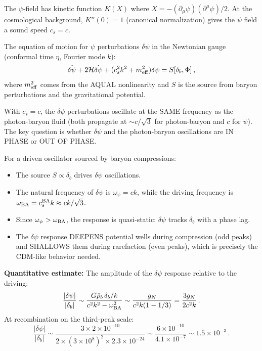 \documentclass[11pt]{article}
\newcommand{\ee}[1]{\times 10^{#1}}
\newcommand{\dpsi}{\delta\psi}
\newcommand{\rhob}{\bar{\rho}_b}
\begin{document}
The $\psi$-field has kinetic function $K(X)$ where $X = -(\partial_\mu\psi)
(\partial^\mu\psi)/2$.  At the cosmological background, $K''(0) = 1$
(canonical normalization) gives the $\psi$ field a sound speed $c_s = c$.

The equation of motion for $\psi$ perturbations $\dpsi$ in the
Newtonian gauge (conformal time $\eta$, Fourier mode $k$):
\begin{equation}
\ddot{\dpsi} + 2\mathcal{H}\dot{\dpsi} + (c_s^2 k^2 + m_{\rm eff}^2)\dpsi
= S[\delta_b, \Phi]\,,
\end{equation}
where $m_{\rm eff}^2$ comes from the AQUAL nonlinearity and $S$ is the
source from baryon perturbations and the gravitational potential.

With $c_s = c$, the $\dpsi$ perturbations oscillate at the SAME frequency
as the photon-baryon fluid (both propagate at $\sim c/\sqrt{3}$ for
photon-baryon and $c$ for $\psi$).  The key question is whether $\dpsi$
and the photon-baryon oscillations are IN PHASE or OUT OF PHASE.

For a driven oscillator sourced by baryon compressions:
\begin{itemize}
\item The source $S \propto \delta_b$ drives $\dpsi$ oscillations.
\item The natural frequency of $\dpsi$ is $\omega_\psi = ck$, while
  the driving frequency is $\omega_{\rm BA} = c_s^{\rm BA} k \approx
  ck/\sqrt{3}$.
\item Since $\omega_\psi > \omega_{\rm BA}$, the response is
  quasi-static: $\dpsi$ tracks $\delta_b$ with a phase lag.
\item The $\dpsi$ response DEEPENS potential wells during compression
  (odd peaks) and SHALLOWS them during rarefaction (even peaks), which
  is precisely the CDM-like behavior needed.
\end{itemize}

\textbf{Quantitative estimate:}  The amplitude of the $\dpsi$ response
relative to the driving:
\begin{equation}
\frac{|\dpsi|}{|\delta_b|} \sim \frac{G\rhob\,\delta_b/k}{c^2 k^2 - \omega_{\rm BA}^2}
\sim \frac{g_N}{c^2 k (1 - 1/3)}
= \frac{3 g_N}{2 c^2 k}\,.
\end{equation}
At recombination on the third-peak scale:
\begin{equation}
\frac{|\dpsi|}{|\delta_b|} \sim \frac{3 \times 2\ee{-10}}{2 \times (3\ee{8})^2
\times 2.3\ee{-24}} \sim \frac{6\ee{-10}}{4.1\ee{-7}} \sim 1.5\ee{-3}\,.
\end{equation}
\end{document}
